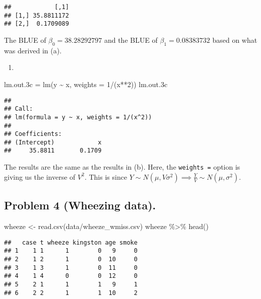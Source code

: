\documentclass[
]{article}
\newenvironment{Shaded}{\begin{snugshade}}{\end{snugshade}}
\newcommand{\AttributeTok}[1]{\textcolor[rgb]{0.77,0.63,0.00}{#1}}
\newcommand{\DecValTok}[1]{\textcolor[rgb]{0.00,0.00,0.81}{#1}}
\newcommand{\FloatTok}[1]{\textcolor[rgb]{0.00,0.00,0.81}{#1}}
\newcommand{\FunctionTok}[1]{\textcolor[rgb]{0.00,0.00,0.00}{#1}}
\newcommand{\NormalTok}[1]{#1}
\newcommand{\OtherTok}[1]{\textcolor[rgb]{0.56,0.35,0.01}{#1}}
\newcommand{\SpecialCharTok}[1]{\textcolor[rgb]{0.00,0.00,0.00}{#1}}
\newcommand{\StringTok}[1]{\textcolor[rgb]{0.31,0.60,0.02}{#1}}
\providecommand{\tightlist}{%
  \setlength{\itemsep}{0pt}\setlength{\parskip}{0pt}}
\begin{document}
\begin{verbatim}
##            [,1]
## [1,] 35.8811172
## [2,]  0.1709089
\end{verbatim}

The BLUE of \(\beta_0 = 38.28292797\) and the BLUE of
\(\beta_1 = 0.08383732\) based on what was derived in (a).

\begin{enumerate}
\def\labelenumi{(\alph{enumi})}
\setcounter{enumi}{2}
\tightlist
\item
\end{enumerate}

\begin{Shaded}
\begin{Highlighting}[]
\NormalTok{lm.out}\FloatTok{.3}\NormalTok{c }\OtherTok{=} \FunctionTok{lm}\NormalTok{(y }\SpecialCharTok{\textasciitilde{}}\NormalTok{ x, }\AttributeTok{weights =} \DecValTok{1}\SpecialCharTok{/}\NormalTok{(x}\SpecialCharTok{**}\DecValTok{2}\NormalTok{))}
\NormalTok{lm.out}\FloatTok{.3}\NormalTok{c}
\end{Highlighting}
\end{Shaded}

\begin{verbatim}
## 
## Call:
## lm(formula = y ~ x, weights = 1/(x^2))
## 
## Coefficients:
## (Intercept)            x  
##     35.8811       0.1709
\end{verbatim}

The results are the same as the results in (b). Here, the
\texttt{weights\ =} option is giving us the inverse of \(V^2\). This is
since
\(Y \sim N(\mu, V \sigma^2) \implies \frac{Y}{V} \sim N(\mu, \sigma^2)\).

\hypertarget{problem-4-wheezing-data.}{%
\subsection{Problem 4 (Wheezing data).}\label{problem-4-wheezing-data.}}

\begin{Shaded}
\begin{Highlighting}[]
\NormalTok{wheeze }\OtherTok{\textless{}{-}} \FunctionTok{read.csv}\NormalTok{(}\StringTok{\textquotesingle{}data/wheeze\_wmiss.csv\textquotesingle{}}\NormalTok{)}
\NormalTok{wheeze }\SpecialCharTok{\%\textgreater{}\%} \FunctionTok{head}\NormalTok{()}
\end{Highlighting}
\end{Shaded}

\begin{verbatim}
##   case t wheeze kingston age smoke
## 1    1 1      1        0   9     0
## 2    1 2      1        0  10     0
## 3    1 3      1        0  11     0
## 4    1 4      0        0  12     0
## 5    2 1      1        1   9     1
## 6    2 2      1        1  10     2
\end{verbatim}
\end{document}
